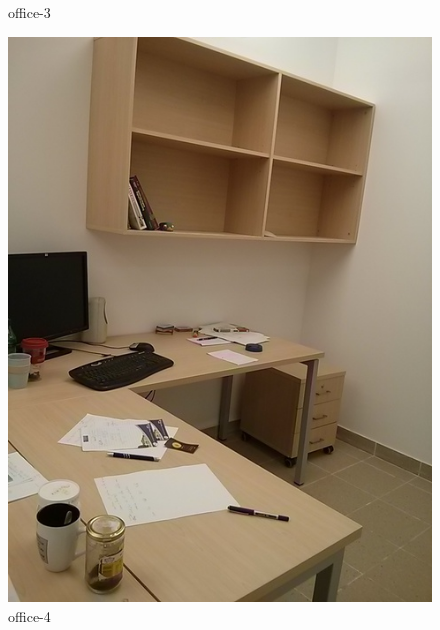 \documentclass[12pt,a4paper]{report}
\begin{document}
\begin{figure}[!htb]
    \caption{office-3}
\endminipage\hfill
{}
  \includegraphics[width=\linewidth]{office4}
    \caption{office-4}
\endminipage\hfill
\end{figure}
\end{document}
